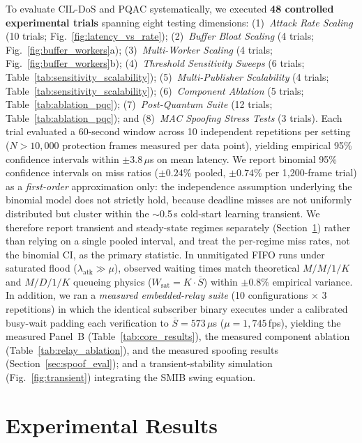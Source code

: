 \documentclass[journal]{IEEEtran}
\begin{document}
To evaluate CIL-DoS and PQAC systematically, we executed \textbf{48 controlled experimental trials} spanning eight testing dimensions: (1)~\emph{Attack Rate Scaling} (10 trials; Fig.~\ref{fig:latency_vs_rate}); (2)~\emph{Buffer Bloat Scaling} (4 trials; Fig.~\ref{fig:buffer_workers}a); (3)~\emph{Multi-Worker Scaling} (4 trials; Fig.~\ref{fig:buffer_workers}b); (4)~\emph{Threshold Sensitivity Sweeps} (6 trials; Table~\ref{tab:sensitivity_scalability}); (5)~\emph{Multi-Publisher Scalability} (4 trials; Table~\ref{tab:sensitivity_scalability}); (6)~\emph{Component Ablation} (5 trials; Table~\ref{tab:ablation_pqc}); (7)~\emph{Post-Quantum Suite} (12 trials; Table~\ref{tab:ablation_pqc}); and (8)~\emph{MAC Spoofing Stress Tests} (3 trials). Each trial evaluated a 60-second window across 10 independent repetitions per setting ($N > 10{,}000$ protection frames measured per data point), yielding empirical 95\% confidence intervals within $\pm 3.8\,\mu$s on mean latency. We report binomial 95\% confidence intervals on miss ratios ($\pm 0.24\%$ pooled, $\pm 0.74\%$ per 1,200-frame trial) as a \emph{first-order} approximation only: the independence assumption underlying the binomial model does not strictly hold, because deadline misses are not uniformly distributed but cluster within the $\sim$0.5\,s cold-start learning transient. We therefore report transient and steady-state regimes separately (Section~\ref{sec:results}) rather than relying on a single pooled interval, and treat the per-regime miss rates, not the binomial CI, as the primary statistic. In unmitigated FIFO runs under saturated flood ($\lambda_{\text{atk}} \gg \mu$), observed waiting times match theoretical $M/M/1/K$ and $M/D/1/K$ queueing physics ($W_{\text{sat}} = K \cdot \overline{S}$) within $\pm 0.8\%$ empirical variance. In addition, we ran a \emph{measured embedded-relay suite} (10 configurations $\times$ 3 repetitions) in which the identical subscriber binary executes under a calibrated busy-wait padding each verification to $\overline{S}=573\,\mu$s ($\mu=1{,}745$\,fps), yielding the measured Panel~B (Table~\ref{tab:core_results}), the measured component ablation (Table~\ref{tab:relay_ablation}), and the measured spoofing results (Section~\ref{sec:spoof_eval}); and a transient-stability simulation (Fig.~\ref{fig:transient}) integrating the SMIB swing equation.

\section{Experimental Results}
\label{sec:results}
\end{document}
